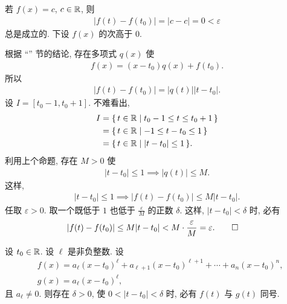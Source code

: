 \begin{pf}
    若 $f(x) = c$, $c \in \mathbb{R}$, 则
    \begin{align*}
        |f(t) - f(t_0)| = |c - c| = 0 < \varepsilon
    \end{align*}
    总是成立的. 下设 $f(x)$ 的次高于 $0$.

    根据 ``\RootsOfPolynomials '' 节的结论, 存在多项式 $q(x)$ 使
    \begin{align*}
        f(x) = (x - t_0) q(x) + f(t_0).
    \end{align*}
    所以
    \begin{align*}
        |f(t) - f(t_0)| = |q(t)| |t - t_0|.
    \end{align*}
    设 $I = [t_0 - 1, t_0 + 1]$. 不难看出,
    \begin{align*}
        I
        = {} & \{\, t \in \mathbb{R} \mid t_0 - 1 \leq t \leq t_0 + 1 \,\} \\
        = {} & \{\, t \in \mathbb{R} \mid -1 \leq t - t_0 \leq 1 \,\}      \\
        = {} & \{\, t \in \mathbb{R} \mid |t - t_0| \leq 1 \,\}.
    \end{align*}
    利用上个命题, 存在 $M > 0$ 使
    \begin{align*}
        |t - t_0| \leq 1 \implies |q(t)| \leq M.
    \end{align*}
    这样,
    \begin{align*}
        |t - t_0| \leq 1 \implies |f(t) - f(t_0)| \leq M |t - t_0|.
    \end{align*}
    任取 $\varepsilon > 0$. 取一个既低于 $1$ 也低于 $\frac{\varepsilon}{M}$ 的正数 $\delta$. 这样, $|t - t_0| < \delta$ 时, 必有
    \begin{align*}
         & |f(t) - f(t_0)| \leq M |t - t_0| < M \cdot \frac{\varepsilon}{M} = \varepsilon. \qedhere
    \end{align*}
\end{pf}

\begin{proposition}
    设 $t_0 \in \mathbb{R}$. 设 $\ell$ 是非负整数. 设
    \begin{align*}
         & f(x) = a_\ell (x - t_0)^\ell + a_{\ell+1} (x - t_0)^{\ell+1}
        + \cdots + a_n (x - t_0)^n,                                     \\
         & g(x) = a_\ell (x - t_0)^\ell,
    \end{align*}
    且 $a_\ell \neq 0$. 则存在 $\delta > 0$, 使 $0 < |t - t_0| < \delta$ 时, 必有 $f(t)$ 与 $g(t)$ 同号.
\end{proposition}

